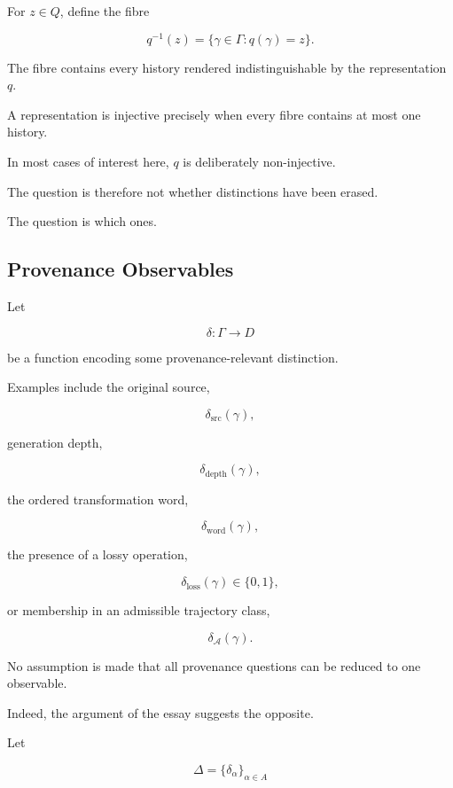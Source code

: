 \documentclass[
  11pt,
  a4paper,
  DIV=12,
  BCOR=0mm,
  parskip=half-
]{scrartcl}
\newcommand{\Adm}{\mathcal A}
\theoremstyle{definition}
\theoremstyle{plain}
\theoremstyle{remark}
\begin{document}
For \(z\in Q\), define the fibre

\[
  q^{-1}(z)
  =
  \{
    \gamma\in\Gamma:q(\gamma)=z
  \}.
\]

The fibre contains every history rendered indistinguishable by the
representation \(q\).

A representation is injective precisely when every fibre contains at most one
history.

In most cases of interest here, \(q\) is deliberately non-injective.

The question is therefore not whether distinctions have been erased.

The question is which ones.


\subsection{Provenance Observables}
\label{app:provenance-observables}

Let

\[
  \delta:\Gamma\to D
\]

be a function encoding some provenance-relevant distinction.

Examples include the original source,

\[
  \delta_{\mathrm{src}}(\gamma),
\]

generation depth,

\[
  \delta_{\mathrm{depth}}(\gamma),
\]

the ordered transformation word,

\[
  \delta_{\mathrm{word}}(\gamma),
\]

the presence of a lossy operation,

\[
  \delta_{\mathrm{loss}}(\gamma)\in\{0,1\},
\]

or membership in an admissible trajectory class,

\[
  \delta_{\Adm}(\gamma).
\]

No assumption is made that all provenance questions can be reduced to one
observable.

Indeed, the argument of the essay suggests the opposite.

Let

\[
  \Delta
  =
  \{
    \delta_\alpha
  \}_{\alpha\in A}
\]
\end{document}
